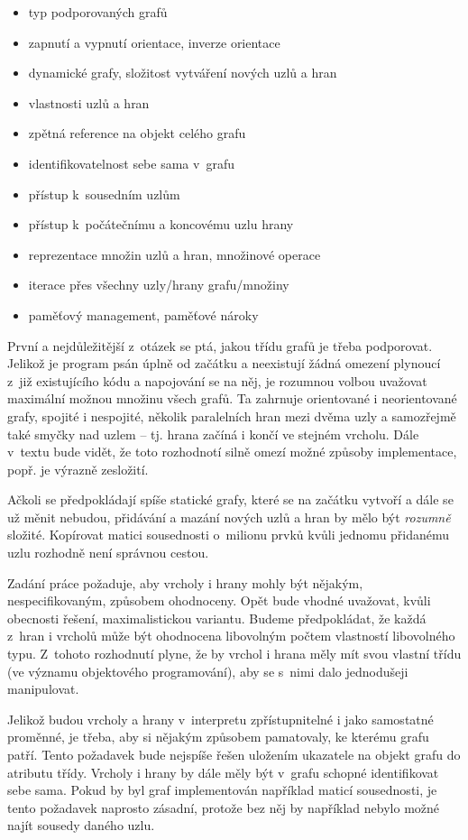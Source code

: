 \documentclass[11pt,twoside,a4paper]{book}
\begin{document}
\begin{itemize}
\item typ podporovaných grafů
\item zapnutí a vypnutí orientace, inverze orientace
\item dynamické grafy, složitost vytváření nových uzlů a hran
\item vlastnosti uzlů a hran
\item zpětná reference na objekt celého grafu
\item identifikovatelnost sebe sama v~grafu
\item přístup k~sousedním uzlům
\item přístup k~počátečnímu a koncovému uzlu hrany
\item reprezentace množin uzlů a hran, množinové operace
\item iterace přes všechny uzly/hrany grafu/množiny
\item paměťový management, paměťové nároky
\end{itemize}

První a nejdůležitější z~otázek se ptá, jakou třídu grafů je třeba podporovat. Jelikož je program psán úplně od začátku a neexistují žádná omezení plynoucí z~již existujícího kódu a napojování se na něj, je rozumnou volbou uvažovat maximální možnou množinu všech grafů. Ta zahrnuje orientované i neorientované grafy, spojité i nespojité, několik paralelních hran mezi dvěma uzly a samozřejmě také smyčky nad uzlem -- tj. hrana začíná i končí ve stejném vrcholu. Dále v~textu bude vidět, že toto rozhodnotí silně omezí možné způsoby implementace, popř. je výrazně zesložití.

Ačkoli se předpokládají spíše statické grafy, které se na začátku vytvoří a dále se už měnit nebudou, přidávání a mazání nových uzlů a hran by mělo být \textit{rozumně} složité. Kopírovat matici sousednosti o~milionu prvků kvůli jednomu přidanému uzlu rozhodně není správnou cestou.

Zadání práce požaduje, aby vrcholy i hrany mohly být nějakým, nespecifikovaným, způsobem ohodnoceny. Opět bude vhodné uvažovat, kvůli obecnosti řešení, maximalistickou variantu. Budeme předpokládat, že každá z~hran i vrcholů může být ohodnocena libovolným počtem vlastností libovolného typu. Z~tohoto rozhodnutí plyne, že by vrchol i hrana měly mít svou vlastní třídu (ve významu objektového programování), aby se s~nimi dalo jednodušeji manipulovat.

Jelikož budou vrcholy a hrany v~interpretu zpřístupnitelné i jako samostatné proměnné, je třeba, aby si nějakým způsobem pamatovaly, ke kterému grafu patří. Tento požadavek bude nejspíše řešen uložením ukazatele na objekt grafu do atributu třídy. Vrcholy i hrany by dále měly být v~grafu schopné identifikovat sebe sama. Pokud by byl graf implementován například maticí sousednosti, je tento požadavek naprosto zásadní, protože bez něj by například nebylo možné najít sousedy daného uzlu.
\end{document}
